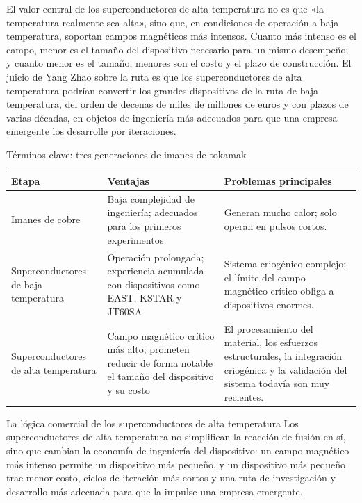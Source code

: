 \documentclass[a4paper]{article}
\begin{document}
El valor central de los superconductores de alta temperatura no es que «la temperatura realmente sea alta», sino que, en condiciones de operación a baja temperatura, soportan campos magnéticos más intensos. Cuanto más intenso es el campo, menor es el tamaño del dispositivo necesario para un mismo desempeño; y cuanto menor es el tamaño, menores son el costo y el plazo de construcción. El juicio de Yang Zhao sobre la ruta es que los superconductores de alta temperatura podrían convertir los grandes dispositivos de la ruta de baja temperatura, del orden de decenas de miles de millones de euros y con plazos de varias décadas, en objetos de ingeniería más adecuados para que una empresa emergente los desarrolle por iteraciones.

\begin{knowledgebox}{Términos clave: tres generaciones de imanes de tokamak}
\begin{tabularx}{\textwidth}{p{}p{}X}
\toprule
Etapa & Ventajas & Problemas principales \\
\midrule
Imanes de cobre & Baja complejidad de ingeniería; adecuados para los primeros experimentos & Generan mucho calor; solo operan en pulsos cortos. \\
Superconductores de baja temperatura & Operación prolongada; experiencia acumulada con dispositivos como EAST, KSTAR y JT60SA & Sistema criogénico complejo; el límite del campo magnético crítico obliga a dispositivos enormes. \\
Superconductores de alta temperatura & Campo magnético crítico más alto; prometen reducir de forma notable el tamaño del dispositivo y su costo & El procesamiento del material, los esfuerzos estructurales, la integración criogénica y la validación del sistema todavía son muy recientes. \\
\bottomrule
\end{tabularx}
\end{knowledgebox}

\begin{importantbox}{La lógica comercial de los superconductores de alta temperatura}
Los superconductores de alta temperatura no simplifican la reacción de fusión en sí, sino que cambian la economía de ingeniería del dispositivo: un campo magnético más intenso permite un dispositivo más pequeño, y un dispositivo más pequeño trae menor costo, ciclos de iteración más cortos y una ruta de investigación y desarrollo más adecuada para que la impulse una empresa emergente.
\end{importantbox}
\end{document}
